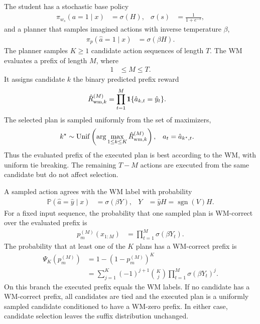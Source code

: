 \documentclass{article}
\newcommand*\sgn[1]{\operatorname{sgn}\!\left({#1}\right)}
\newcommand*\I{\mathbf 1}
\begin{document}
The student has a stochastic base policy
\begin{align}
\pi_{w_s}(a=1\mid x) &= \sigma(H), & \sigma(s) &= \frac{1}{1+e^{-s}},
\end{align}
and a planner that samples imagined actions with inverse temperature $\beta$,
\begin{align}
\pi_p(\hat a=1\mid x) &= \sigma(\beta H).
\end{align}
The planner samples $K\geq1$ candidate action sequences of length $T$. The WM evaluates a prefix of length $M$, where
\begin{align}
1 &\leq M\leq T.
\end{align}
It assigns candidate $k$ the binary predicted prefix reward
\begin{align}
\hat R_{{\rm wm},k}^{(M)} &= \prod_{t=1}^M \I\{\hat a_{k,t}=\hat y_t\}.
\end{align}
The selected plan is sampled uniformly from the set of maximizers,
\begin{align}
k^\star &\sim {\rm Unif}\left(\arg\max_{1\leq k\leq K}\hat R_{{\rm wm},k}^{(M)}\right), & a_t &= \hat a_{k^\star,t}.
\end{align}
Thus the evaluated prefix of the executed plan is best according to the WM, with uniform tie breaking. The remaining $T-M$ actions are executed from the same candidate but do not affect selection.

A sampled action agrees with the WM label with probability
\begin{align}
\mathbb P(\hat a=\hat y\mid x) &= \sigma(\beta Y), & Y &= \hat yH=\sgn{V}H.
\end{align}
For a fixed input sequence, the probability that one sampled plan is WM-correct over the evaluated prefix is
\begin{align}
p_m^{(M)}(x_{1:M}) &= \prod_{t=1}^M \sigma(\beta Y_t).
\end{align}
The probability that at least one of the $K$ plans has a WM-correct prefix is
\begin{align}
\Psi_K(p_m^{(M)}) &= 1-\left(1-p_m^{(M)}\right)^K \\
&= \sum_{j=1}^K(-1)^{j+1}\binom Kj\prod_{t=1}^M\sigma(\beta Y_t)^j.
\end{align}
On this branch the executed prefix equals the WM labels. If no candidate has a WM-correct prefix, all candidates are tied and the executed plan is a uniformly sampled candidate conditioned to have a WM-zero prefix. In either case, candidate selection leaves the suffix distribution unchanged.
\end{document}
